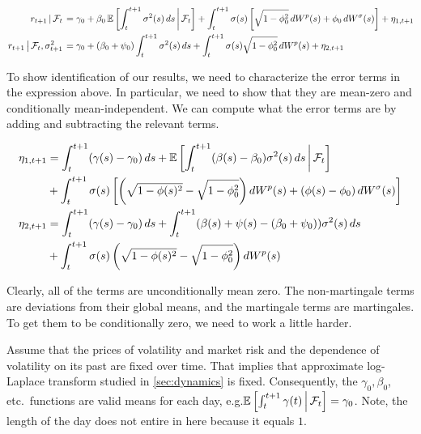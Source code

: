 \documentclass[11pt, letterpaper, twoside, final]{article}
\begin{document}
\begin{alignat}{1}
    \label{eqn:price_decomp}
    \left. r_{t+1} \,\middle\vert\, \mathcal{F}_t \right. 
    &= \gamma_0 + \beta_0 \operatorname{\mathbb{E}}\left[\int_t^{t+1} \sigma^2(s) \mathop{}\!d s \,\middle\vert\, \mathcal{F}_t\right] + \int_t^{t+1} \sigma(s)
       \left[\sqrt{1 - \phi_0^2} \mathop{}\!d W^{p}(s) + \phi_0 \mathop{}\!d W^{\sigma}(s)\right] + \eta_{1,t+1} \\
    \left. r_{t+1} \,\middle\vert\, \mathcal{F}_t, \sigma^2_{t+1} \right. 
    &= \gamma_0 + (\beta_0 + \psi_0) \int_t^{t+1} \sigma^2(s) \mathop{}\!d s + \int_t^{t+1} \sigma(s) \sqrt{1-\phi_0^2}
       \mathop{}\!d W^{p}(s) + \eta_{2, t+1} 
\end{alignat}

To show identification of our results, we need to characterize the error terms in the expression above.
In particular, we need to show that they are mean-zero and conditionally mean-independent.
We can compute what the error terms are by adding and subtracting the relevant terms.

\begin{alignat}{1}
    \eta_{1,t+1} 
    &= \int_t^{t+1}(\gamma(s) - \gamma_0) \dif s + \E\left[\int_t^{t+1} (\beta(s) - \beta_0) \sigma^2(s) \dif s
        \mvert \F_t\right] \\
    &+ \int_t^{t+1} \sigma(s) \left[\left(\sqrt{1 - \phi(s)^2} - \sqrt{1 - \phi_0^2}\right) \dif W^{p}(s) +
        \left(\phi(s) - \phi_0\right) \dif W^{\sigma}(s)\right] \nonumber \\
%
    \eta_{2,t+1} 
    &= \int_t^{t+1}(\gamma(s) - \gamma_0) \dif s + \int_t^{t+1} (\beta(s) + \psi(s) - (\beta_0 + \psi_0))
       \sigma^2(s) \dif s \\
    &+ \int_t^{t+1} \sigma(s) \left(\sqrt{1 - \phi(s)^2} - \sqrt{1 - \phi_0^2}\right) \dif W^{p}(s) \nonumber 
\end{alignat}

Clearly, all of the terms are  unconditionally mean zero. 
The non-martingale terms are deviations from their global means, and the martingale terms are martingales.
To get them to be conditionally zero, we need to work a little harder.

Assume that the prices of volatility and market risk and the dependence of volatility on its past are fixed over
time.
That implies that approximate log-Laplace transform studied in \cref{sec:dynamics} is fixed.
Consequently, the $\gamma_0, \beta_0$, etc.\ functions are valid means for each day, e.g.\@ $\operatorname{\mathbb{E}}\left[\int_t^{t+1}
\gamma(t) \,\middle\vert\, \mathcal{F}_t \right] = \gamma_0$. 
Note, the length of the day does not entire in here because it equals $1$.
\end{document}
